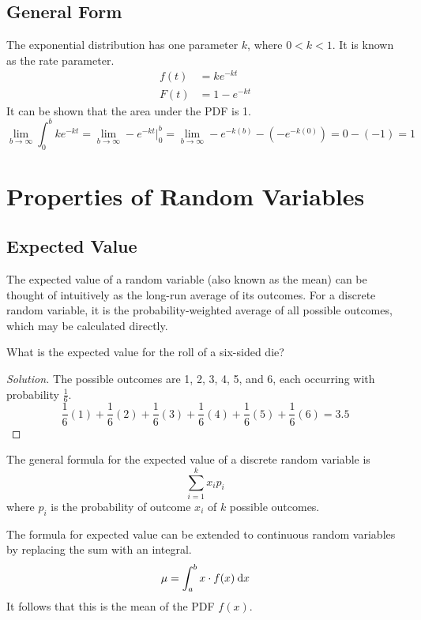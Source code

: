 \documentclass[11pt,leqno,letterpaper]{article}
\begin{document}
\subsection{General Form}
The exponential distribution has one parameter $k$,
where $0<k<1$. It is known as the rate parameter.
\begin{align*}
\tag{PDF}
f(t) &= ke^{-kt} \\
\tag{CDF}
F(t) &= 1-e^{-kt}
\end{align*}
It can be shown that the area under the PDF is 1.
\[
\lim_{b\to \infty} \int_0^b ke^{-kt} =
\lim_{b\to \infty} -e^{-kt}\bigg|_0^b =
\lim_{b\to \infty} -e^{-k(b)} - \left(-e^{-k(0)}\right) =
0 - (-1) = 1
\]

\section{Properties of Random Variables}
\subsection{Expected Value}
The expected value of a random variable (also known as the mean)
can be thought of intuitively as the long-run average of its outcomes.
For a discrete random variable, it is the probability-weighted
average of all possible outcomes, which may be calculated directly.

\begin{mdframed}
\begin{problem}
What is the expected value for the roll of a six-sided die?
\begin{proof}[Solution]
The possible outcomes are 1, 2, 3, 4, 5, and 6, each occurring
with probability $\frac{1}{6}$.
\[
\frac{1}{6}(1)+ \frac{1}{6}(2)+ \frac{1}{6}(3)+
\frac{1}{6}(4)+ \frac{1}{6}(5)+ \frac{1}{6}(6) = 3.5
\]
\end{proof}
\end{problem}
\end{mdframed}

The general formula for the expected value of a
discrete random variable is
\[
\sum_{i=1}^k x_i p_i
\]
where $p_i$ is the probability of outcome $x_i$
of $k$ possible outcomes.

The formula for expected value can be extended to continuous
random variables by replacing the sum with an integral.
\[
\mu = \int_a^b x\cdot f(x)\:\mathrm{d}x
\]
It follows that this is the mean of the PDF $f(x)$.
\end{document}
